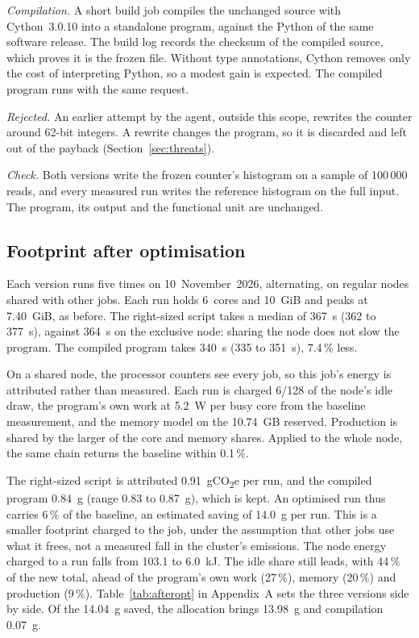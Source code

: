 \documentclass[conference,a4paper]{IEEEtran}
\begin{document}
\emph{Compilation.} A short build job compiles the unchanged source with
Cython~3.0.10 into a standalone program, against the Python of the same
software release. The build log records the checksum of the compiled source,
which proves it is the frozen file. Without type annotations, Cython removes
only the cost of interpreting Python, so a modest gain is expected. The
compiled program runs with the same request.

\emph{Rejected.} An earlier attempt by the agent, outside this scope, rewrites
the counter around 62-bit integers. A rewrite changes the program, so
it is discarded and left out of the payback (Section~\ref{sec:threats}).

\emph{Check.} Both versions write the frozen counter's histogram on a sample of
100\,000 reads, and every measured run writes the reference histogram on the
full input. The program, its output and the functional unit are unchanged.

\subsection{Footprint after optimisation}\label{sec:afteropt}
Each version runs five times on 10~November~2026, alternating, on regular nodes
shared with other jobs. Each run holds 6~cores and 10~GiB and peaks at 7.40~GiB,
as before. The right-sized script takes a median of 367~s (362 to 377~s),
against 364~s on the exclusive node: sharing the node does not slow the
program. The compiled program takes 340~s (335 to 351~s), 7.4\,\% less.

On a shared node, the processor counters see every job, so this job's energy is
attributed rather than measured. Each run is charged 6/128 of the node's idle
draw, the program's own work at 5.2~W per busy core from the baseline
measurement, and the memory model on the 10.74~GB reserved. Production is shared
by the larger of the core and memory shares. Applied to the whole node, the same
chain returns the baseline within 0.1\,\%.

The right-sized script is attributed 0.91~gCO\textsubscript{2}e per run, and
the compiled program 0.84~g (range 0.83 to 0.87~g), which is kept. An optimised
run thus carries 6\,\% of the baseline, an estimated saving of 14.0~g per run.
This is a smaller footprint charged to the job, under the assumption that other
jobs use what it frees, not a measured fall in the cluster's emissions. The node
energy charged to a run falls from 103.1 to 6.0~kJ. The idle share still leads,
with 44\,\% of the new total, ahead of the program's own work (27\,\%), memory
(20\,\%) and production (9\,\%). Table~\ref{tab:afteropt} in Appendix~A sets
the three versions side by side. Of the 14.04~g saved, the allocation brings
13.98~g and compilation 0.07~g.
\end{document}
